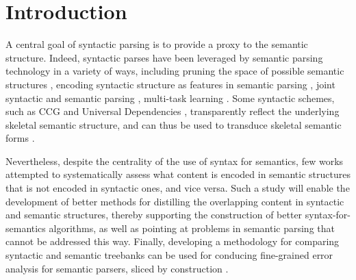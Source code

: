 \documentclass[11pt,a4paper]{article}
\begin{document}












\section{Introduction}\label{sec:introduction}

  A central goal of syntactic parsing is to provide a proxy to the semantic structure.
  Indeed, syntactic parses have been leveraged by semantic parsing technology in a variety of ways,
  including pruning the space of possible semantic structures \cite{xue2004calibrating}, 
  encoding syntactic structure as features in semantic parsing \cite{gildea2002automatic}, 
  joint syntactic and semantic parsing \cite{surdeanu2008conll,hajivc2009conll},
  multi-task learning \cite{swayamdipta2018syntactic}. 
  Some syntactic schemes, such as CCG \cite{Steedman:00} and Universal Dependencies \cite[UD; ][]{nivre2016universal},
  transparently reflect the underlying skeletal semantic structure, and can thus be used 
  to transduce skeletal semantic forms \cite{Basile:12,white2016universal,reddy2017universal}.
  
  Nevertheless, despite the centrality of the use of syntax for semantics, few works attempted
  to systematically assess what content is encoded in semantic structures that is
  not encoded in syntactic ones, and vice versa. Such a study will enable the development of better
  methods for distilling the overlapping content in syntactic and semantic structures, thereby supporting
  the construction of better syntax-for-semantics algorithms, as well as pointing at problems in semantic
  parsing that cannot be addressed this way. Finally, developing a methodology for comparing syntactic
  and semantic treebanks can be used for conducing fine-grained error analysis for semantic parsers, sliced
  by construction \cite[cf.][]{szubert2018structured}.
\end{document}
